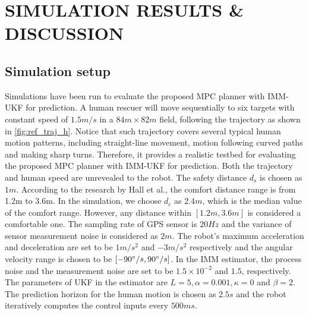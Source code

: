 \documentclass[letterpaper, 10 pt, conference]{ieeeconf}
\begin{document}
	
	\section{SIMULATION RESULTS \& DISCUSSION}\label{sec:results}
	\subsection{Simulation setup}
	Simulations have been run to evaluate the proposed MPC planner with IMM-UKF for prediction.
	A human rescuer will move sequentially to six targets with constant speed of $1.5m/s$ in a $84 m\times 82 m$ field, following the trajectory as shown in \cref{fig:ref_traj_h}.
	Notice that such trajectory covers several typical human motion patterns, including straight-line movement, motion following curved paths and making sharp turns.
	Therefore, it provides a realistic testbed for evaluating the proposed MPC planner with IMM-UKF for prediction.
	Both the trajectory and human speed are unrevealed to the robot.
	The safety distance $d_s$ is chosen as $1m$.
	According to the research by Hall et al.\cite{hall1968proxemics}, the comfort distance range is from 1.2m to 3.6m.
	In the simulation, we choose $d_c$ as $2.4m$, which is the median value of the comfort range.
	However, any distance within $[1.2m,3.6m]$ is considered a comfortable one.
	The sampling rate of GPS sensor is $20Hz$ and the variance of sensor measurement noise is considered as $2m$. 
	The robot's maximum acceleration and deceleration are set to be $1 m/s^2$ and $-3 m/s^2$ respectively and the angular velocity range is chosen to be $[-90\degree/s,90\degree/s]$.
	In the IMM estimator, the process noise and the measurement noise are set to be $1.5\times 10^{-2}$ and $1.5$, respectively. The parameters of UKF in the estimator are $L=5,\alpha=0.001, \kappa=0$ and $\beta=2$.
	The prediction horizon for the human motion is chosen as $2.5s$ and the robot iteratively computes the control inputs every $500ms$.
	
\end{document}
